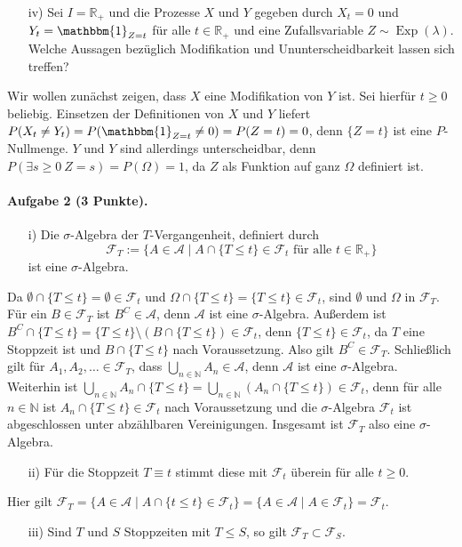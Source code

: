 \documentclass{article}
\begin{document}
\begin{itemize}
\item [iv)] Sei $I=\mathbb{R}_+$ und die Prozesse $X$ und $Y$ gegeben durch $X_t=0$ und $Y_t=\mathbbm{1}_{Z=t}$ für alle $t\in\mathbb{R}_+$ und eine Zufallsvariable $Z\sim\operatorname{Exp}(\lambda)$.
  Welche Aussagen bezüglich Modifikation und Ununterscheidbarkeit lassen sich treffen? 
\end{itemize}
Wir wollen zunächst zeigen, dass $X$ eine Modifikation von $Y$ ist.
Sei hierfür $t\geq0$ beliebig.
Einsetzen der Definitionen von $X$ und $Y$ liefert $P(X_t\neq Y_t)=P(\mathbbm{1}_{Z=t}\neq0)=P(Z=t)=0$, denn $\{Z=t\}$ ist eine $P$-Nullmenge.
$Y$ und $Y$ sind allerdings unterscheidbar, denn $P(\exists s\geq0~Z=s)=P(\Omega)=1$, da $Z$ als Funktion auf ganz $\Omega$ definiert ist.
\paragraph{Aufgabe 2 \textnormal{(3 Punkte)}.}
\begin{itemize}
\item [i)] Die $\sigma$-Algebra der $T$-Vergangenheit, definiert durch
  \[
    \mathscr{F}_T:=\bigl\{A\in\mathscr{A}\mid A\cap\{T\leq t\}\in\mathscr{F}_t\text{ für alle }t\in\mathbb{R}_+\bigr\}
  \]
  ist eine $\sigma$-Algebra.
\end{itemize}
Da $\emptyset\cap\{T\leq t\}=\emptyset\in\mathscr{F}_t$ und $\Omega\cap\{T\leq t\}=\{T\leq t\}\in\mathscr{F}_t$, sind $\emptyset$ und $\Omega$ in $\mathscr{F}_T$.
Für ein $B\in\mathscr{F}_T$ ist $B^C\in\mathscr{A}$, denn $\mathscr{A}$ ist eine $\sigma$-Algebra.
Außerdem ist $B^C\cap\{T\leq t\}=\{T\leq t\}\setminus(B\cap\{T\leq t\})\in\mathscr{F}_t$, denn $\{T\leq t\}\in\mathscr{F}_t$, da $T$ eine Stoppzeit ist und $B\cap\{T\leq t\}$ nach Voraussetzung. Also gilt $B^C\in\mathscr{F}_T$.
Schließlich gilt für $A_1,A_2,\dots\in\mathscr{F}_T$, dass $\bigcup_{n\in\mathbb{N}}A_n\in\mathscr{A}$, denn $\mathscr{A}$ ist eine $\sigma$-Algebra.
Weiterhin ist $\bigcup_{n\in\mathbb{N}}A_n\cap\{T\leq t\}=\bigcup_{n\in\mathbb{N}}(A_n\cap\{T\leq t\})\in\mathscr{F}_t$, denn für alle $n\in\mathbb{N}$ ist $A_n\cap\{T\leq t\}\in\mathscr{F}_t$ nach Voraussetzung und die $\sigma$-Algebra $\mathscr{F}_t$ ist abgeschlossen unter abzählbaren Vereinigungen.
Insgesamt ist $\mathscr{F}_T$ also eine $\sigma$-Algebra.
\begin{itemize}
\item [ii)] 
  Für die Stoppzeit $T\equiv t$ stimmt diese mit $\mathscr{F}_t$ überein für alle $t\geq 0$.
\end{itemize}
Hier gilt $\mathscr{F}_T=\bigl\{A\in\mathscr{A}\mid A\cap\{t\leq t\}\in\mathscr{F}_t\bigr\}=\{A\in\mathscr{A}\mid A\in\mathscr{F}_t\}=\mathscr{F}_t$.
\begin{itemize}
\item [iii)] Sind $T$ und $S$ Stoppzeiten mit $T\leq S$, so gilt $\mathscr{F}_T\subset\mathscr{F}_S$.
\end{itemize}
\end{document}
